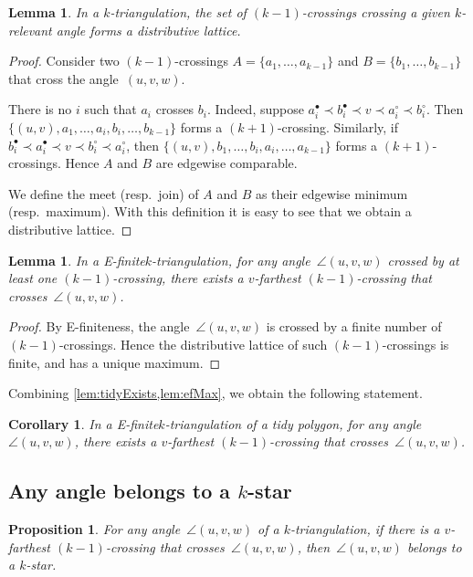 \documentclass{amsart}
\newtheorem{proposition}[theorem]{Proposition}
\newtheorem{lemma}[theorem]{Lemma}
\newtheorem{corollary}[theorem]{Corollary}
\theoremstyle{remark}
\newcommand*{\ef}[0]{E-finite\xspace}
\newcommand*{\ktg}[0]{$k$-triangulation\xspace}
\newcommand{\cl}{\prec}
\begin{document}
\begin{lemma}
In a \ktg, the set of $(k-1)$-crossings crossing a given $k$-relevant angle forms a distributive lattice.
\end{lemma}

\begin{proof}
Consider two $(k-1)$-crossings $A = \{a_1, \dots, a_{k-1}\}$ and $B = \{b_1, \dots, b_{k-1}\}$ that cross the angle~$(u,v,w)$.

There is no $i$ such that $a_i$ crosses $b_i$. 
Indeed, suppose $a^\bullet_i \cl b^\bullet_i \cl v \cl a^\circ_i \cl b^\circ_i$. Then $\{(u, v), a_1, \dots, a_i, b_i, \dots, b_{k-1}\}$ forms a $(k+1)$-crossing. 
Similarly, if $b^\bullet_i \cl a^\bullet_i \cl v \cl b^\circ_i \cl a^\circ_i$, then $\{(u, v), b_1, \dots, b_i, a_i, \dots, a_{k-1}\}$ forms a $(k+1)$-crossings.
Hence $A$ and $B$ are edgewise comparable.

We define the meet (resp.~join) of $A$ and $B$ as their edgewise minimum (resp.~maximum). With this definition it is easy to see that we obtain a distributive lattice.
\end{proof}

\begin{lemma}
\label{lem:efMax}
In a \ef \ktg, for any angle~$\angle(u,v,w)$ crossed by at least one $(k-1)$-crossing, there exists a $v$-farthest $(k-1)$-crossing that crosses~$\angle(u,v,w)$.
\end{lemma}

\begin{proof}
By \ef{}ness, the angle~$\angle(u,v,w)$ is crossed by a finite number of $(k-1)$-crossings. Hence the distributive lattice of such $(k-1)$-crossings is finite, and has a unique maximum.
\end{proof}

Combining \cref{lem:tidyExists,lem:efMax}, we obtain the following statement.

\begin{corollary}
\label{coro:farthestTidy}
In a \ef \ktg of a tidy polygon, for any angle~$\angle(u,v,w)$, there exists a $v$-farthest $(k-1)$-crossing that crosses~$\angle(u,v,w)$.
\end{corollary}


\subsection{Any angle belongs to a $k$-star}

\begin{proposition}
\label{prop:angleBelongStar}
For any angle~$\angle(u,v,w)$ of a \ktg, if there is a $v$-farthest $(k-1)$-crossing that crosses~$\angle(u,v,w)$, then~$\angle(u,v,w)$ belongs to a $k$-star.
\end{proposition}
\end{document}
